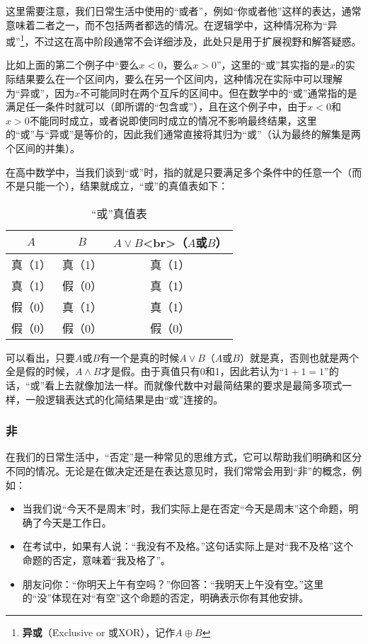 这里需要注意，我们日常生活中使用的“或者”，例如“你或者他”这样的表达，通常意味着二者之一，而不包括两者都选的情况。在逻辑学中，这种情况称为“异或”\footnote{\textbf{异或}（Exclusive or 或XOR），记作$A\oplus B$}，不过这在高中阶段通常不会详细涉及，此处只是用于扩展视野和解答疑惑。

比如上面的第二个例子中“要么$x<0$，要么$x>0$”，这里的“或”其实指的是$x$的实际结果要么在一个区间内，要么在另一个区间内，这种情况在实际中可以理解为“异或”，因为$x$不可能同时在两个互斥的区间中。但在数学中的“或”通常指的是满足任一条件时就可以（即所谓的“包含或”），且在这个例子中，由于$x < 0$和$x > 0$不能同时成立，或者说即使同时成立的情况不影响最终结果，这里的“或”与“异或”是等价的，因此我们通常直接将其归为“或”（认为最终的解集是两个区间的并集）。

在高中数学中，当我们谈到“或”时，指的就是只要满足多个条件中的任意一个（而不是只能一个），结果就成立，“或”的真值表如下：

\begin{table}[ht]
\centering
\caption{“或”真值表}\label{tab_HsCoPr2}
\begin{tabular}{|c|c|c|}
\hline
$A$ & $B$ & $A \lor B$<br>（$A$或$B$） \\
\hline
真（1） & 真（1） & 真（1） \\
\hline
真（1） & 假（0） & 真（1） \\
\hline
假（0） & 真（1） & 真（1） \\
\hline
假（0） & 假（0） & 假（0） \\
\hline
\end{tabular}
\end{table}

可以看出，只要$A$或$B$有一个是真的时候$A\lor B$（$A$或$B$）就是真，否则也就是两个全是假的时候，$A\land B$才是假。由于真值只有0和1，因此若认为“$1+1=1$”的话，“或”看上去就像加法一样。而就像代数中对最简结果的要求是最简多项式一样，一般逻辑表达式的化简结果是由“或”连接的。

\subsubsection{非}

在我们的日常生活中，“否定”是一种常见的思维方式，它可以帮助我们明确和区分不同的情况。无论是在做决定还是在表达意见时，我们常常会用到“非”的概念，例如：
\begin{itemize}
\item 当我们说“今天不是周末”时，我们实际上是在否定“今天是周末”这个命题，明确了今天是工作日。
\item 在考试中，如果有人说：“我没有不及格。”这句话实际上是对“我不及格”这个命题的否定，意味着“我及格了”。
\item 朋友问你：“你明天上午有空吗？”你回答：“我明天上午没有空。”这里的“没”体现在对“有空”这个命题的否定，明确表示你有其他安排。
\end{itemize}

